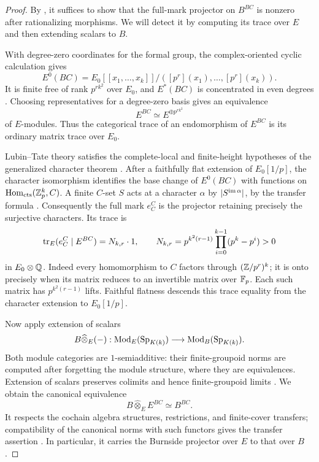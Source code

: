 \begin{proof}
By , it suffices to show that the
full-mark projector on \(B^{BC}\) is nonzero after rationalizing
morphisms. We will detect it by computing its trace over \(E\) and
then extending scalars to \(B\).

With degree-zero coordinates for the formal
group, the complex-oriented cyclic calculation gives
\[
 E^0(BC)=E_0[[x_1,\ldots,x_k]]/
       ([p^r](x_1),\ldots,[p^r](x_k)).
\]
It is finite free of rank \(p^{rk^2}\) over \(E_0\), and
\(E^*(BC)\) is concentrated in even degrees
\cite[Corollaries~5.8 and~5.10]{HKR}.  Choosing representatives for a
degree-zero basis gives an equivalence
\[
 E^{BC}\simeq E^{\oplus p^{rk^2}}
\]
of \(E\)-modules.  Thus the categorical trace of an endomorphism of
\(E^{BC}\) is its ordinary matrix trace over \(E_0\).

Lubin--Tate theory satisfies the complete-local and finite-height
hypotheses of the generalized character theorem
\cite[Theorem~C and the examples following it]{HKR}.  After a faithfully
flat extension of \(E_0[1/p]\), the character isomorphism identifies
the base change of \(E^0(BC)\) with functions on
\(\operatorname{Hom}_{\mathrm{cts}}(\mathbb Z_p^k,C)\).  A finite \(C\)-set \(S\) acts at a
character \(\alpha\) by \(|S^{\operatorname{im}\alpha}|\), by the transfer formula
\cite[Theorem~D and Example~6.16]{HKR}.  Consequently the full mark
\(e_C^C\) is the projector retaining precisely the surjective
characters.  Its trace is
\begin{equation}\label{eq:full-mark-trace}
 \operatorname{tr}_E(e_C^C\mid E^{BC})
   =N_{k,r}\cdot1,
 \qquad
 N_{k,r}=p^{k^2(r-1)}\prod_{i=0}^{k-1}(p^k-p^i)>0
\end{equation}
in \(E_0\otimes\mathbb Q\).  Indeed every homomorphism to \(C\) factors
through \((\mathbb Z/p^r)^k\); it is onto precisely when its matrix reduces
to an invertible matrix over \(\mathbb F_p\).  Each such matrix has
\(p^{k^2(r-1)}\) lifts.  Faithful flatness descends this trace equality
from the character extension to \(E_0[1/p]\).

Now apply extension of scalars
\[
 B\widehat\otimes_E(-):
 \operatorname{Mod}_E(\mathrm{Sp}_{K(k)})\longrightarrow\operatorname{Mod}_B(\mathrm{Sp}_{K(k)}).
\]
Both module categories are \(1\)-semiadditive: their finite-groupoid
norms are computed after forgetting the module structure, where they
are equivalences.  Extension of scalars preserves colimits and hence
finite-groupoid limits \cite[Corollary~3.2.4]{CSY}.  We obtain the
canonical equivalence
\begin{equation}\label{eq:local-cochain-base-change}
 B\widehat\otimes_E E^{BC}\simeq B^{BC}.
\end{equation}
It respects the cochain algebra structures, restrictions, and
finite-cover transfers; compatibility of the canonical norms with
such functors gives the transfer assertion
\cite[Theorem~3.2.3 and Corollary~3.2.7]{CSY}.  In particular, it carries the Burnside
projector over \(E\) to that over \(B\).


\end{proof}
